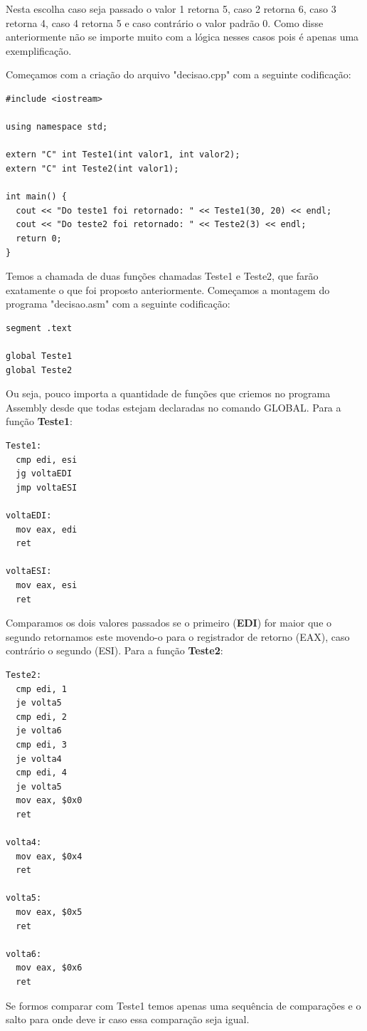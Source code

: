 Nesta escolha caso seja passado o valor 1 retorna 5, caso 2 retorna 6, caso 3 retorna 4, caso 4 retorna 5 e caso contrário o valor padrão 0. Como disse anteriormente não se importe muito com a lógica nesses casos pois é apenas uma exemplificação.

Começamos com a criação do arquivo "decisao.cpp" com a seguinte codificação:
\begin{lstlisting}[]
#include <iostream>

using namespace std;

extern "C" int Teste1(int valor1, int valor2);
extern "C" int Teste2(int valor1);

int main() {
  cout << "Do teste1 foi retornado: " << Teste1(30, 20) << endl;
  cout << "Do teste2 foi retornado: " << Teste2(3) << endl;
  return 0;
}
\end{lstlisting}

Temos a chamada de duas funções chamadas Teste1 e Teste2, que farão exatamente o que foi proposto anteriormente. Começamos a montagem do programa "decisao.asm" com a seguinte codificação:
\begin{lstlisting}[]
segment .text

global Teste1
global Teste2
\end{lstlisting}

Ou seja, pouco importa a quantidade de funções que criemos no programa Assembly desde que todas estejam declaradas no comando GLOBAL. Para a função \textbf{Teste1}:
\begin{lstlisting}[]
Teste1:
  cmp edi, esi
  jg voltaEDI
  jmp voltaESI

voltaEDI:
  mov eax, edi
  ret

voltaESI:
  mov eax, esi
  ret
\end{lstlisting}

Comparamos os dois valores passados se o primeiro (\textbf{EDI}) for maior que o segundo retornamos este movendo-o para o registrador de retorno (EAX), caso contrário o segundo (ESI). Para a função \textbf{Teste2}:
\begin{lstlisting}[]
Teste2:
  cmp edi, 1
  je volta5
  cmp edi, 2
  je volta6
  cmp edi, 3
  je volta4
  cmp edi, 4
  je volta5
  mov eax, $0x0
  ret

volta4:
  mov eax, $0x4
  ret

volta5:
  mov eax, $0x5
  ret    

volta6:
  mov eax, $0x6
  ret
\end{lstlisting}

Se formos comparar com Teste1 temos apenas uma sequência de comparações e o salto para onde deve ir caso essa comparação seja igual.

